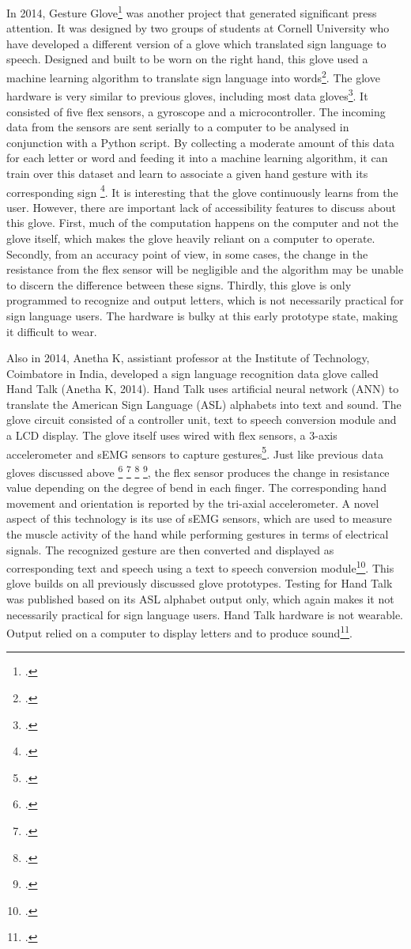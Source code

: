 In 2014, Gesture Glove\footcite{CornellGlove} was another project that generated significant press attention. It was designed by two groups of students at Cornell University who have developed a different version of a glove which translated sign language to speech. Designed and built to be worn on the right hand, this glove used a machine learning algorithm to translate sign language into words\footcite{CornellGlove}. The glove hardware is very similar to previous gloves, including most data gloves\footcite{Premaratne2013a}. It consisted of five flex sensors, a gyroscope and a microcontroller. The incoming data from the sensors are sent serially to a computer to be analysed in conjunction with a Python script. By collecting a moderate amount of this data for each letter or word and feeding it into a machine learning algorithm, it can train over this dataset and learn to associate a given hand gesture with its corresponding sign \footcite{CornellGlove}. It is interesting that the glove continuously learns from the user. However, there are important lack of accessibility features to discuss about this glove. First, much of the computation happens on the computer and not the glove itself, which makes the glove heavily reliant on a computer to operate. Secondly, from an accuracy point of view, in some cases, the change in the resistance from the flex sensor will be negligible and the algorithm may be unable to discern the difference between these signs. Thirdly, this glove is only programmed to recognize and output letters, which is not necessarily practical for sign language users. The hardware is bulky at this early prototype state, making it difficult to wear. 


Also in 2014, Anetha K, assistiant professor at the Institute of Technology, Coimbatore in India, developed a sign language recognition data glove called Hand Talk (Anetha K, 2014). Hand Talk uses artificial neural network (ANN) to translate the American Sign Language (ASL) alphabets into text and sound. The glove circuit consisted of a controller unit, text to speech conversion module and a LCD display. The glove itself uses wired with flex sensors, a 3-axis accelerometer and sEMG sensors to capture gestures\footcite{AnethaK2014}. Just like previous data gloves discussed above \footcite{AcceleGlove2016} \footcite{EnableTalk} \footcite{Rozak} \footcite{CornellGlove}, the flex sensor produces the change in resistance value depending on the degree of bend in each finger. The corresponding hand movement and orientation is reported by the tri-axial accelerometer. A novel aspect of this technology is its use of sEMG sensors, which are used to measure the muscle activity of the hand while performing gestures in terms of electrical signals. The recognized gesture are then converted and displayed as corresponding text and speech using a text to speech conversion module\footcite{AnethaK2014}. This glove builds on all previously discussed glove prototypes. Testing for Hand Talk was published based on its ASL alphabet output only, which again makes it not necessarily practical for sign language users. Hand Talk hardware is not wearable. Output relied on a computer to display letters and to produce sound\footcite{AnethaK2014}. 


